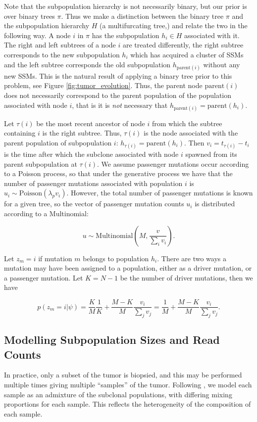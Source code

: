 \documentclass{bioinfo}
\newcommand{\parent}{\text{parent}}
\newcommand{\Poisson}{\mathrm{Poisson} }
\newcommand{\Multinomial}{\mathrm{Multinomial}}
\begin{document}
\begin{methods}
Note that the subpopulation hierarchy is not necessarily binary, but our prior is over binary trees $\pi$.  Thus we make a distinction between the binary tree $\pi$ and the subpopulation hierarchy $H$ (a multifurcating tree,) and relate the two in the following way.  A node $i$ in $\pi$ has the subpopulation $h_i \in H$ associated with it.  The right and left subtrees of a node $i$ are treated differently, the right subtree corresponds to the new subpopulation $h_{i}$ which has acquired a cluster of SSMs and the left subtree corresponds the old subpopulation $h_{\parent(i)}$ without any new SSMs.  This is the natural result of applying a binary tree prior to this problem, see Figure \ref{fig:tumor_evolution}.  Thus, the parent node $\parent(i)$ does not necessarily correspond to the parent population of the population associated with node $i$, that is it is \emph{not} necessary that $h_{\parent(i)} = \parent(h_i)$. 

Let $\tau(i)$ be the most recent ancestor of node $i$ from which the subtree containing $i$ is the right subtree.  Thus, $\tau(i)$ is the node associated with the parent population of subpopulation $i$: $h_{\tau(i)} = \parent(h_i)$.  Then $v_i = t_{\tau(i)} - t_i$ is the time after which the subclone associated with node $i$ spawned from its parent subpopulation at $\tau(i)$.  We assume passenger mutations occur according to a Poisson process, so that under the generative process we have that the number of passenger mutations associated with population $i$ is $u_i \sim \Poisson(\lambda_p v_i)$. However, the total number of passenger mutations is known for a given tree, so the vector of passenger mutation counts $u_i$ is distributed according to a Multinomial:

\begin{equation} u \sim \Multinomial\left(M, \frac{v}{\sum_i v_i}\right). \end{equation}

Let $z_m=i$ if mutation $m$ belongs to population $h_i$.  There are two ways a mutation may have been assigned to a population, either as a driver mutation, or a passenger mutation.  Let $K=N-1$ be the number of driver mutations, then we have

\begin{equation}
p(z_m=i|\psi) = \frac{K}{M}\frac{1}{K} + \frac{M-K}{M} \frac{v_i}{\sum_j v_j} = \frac{1}{M} + \frac{M-K}{M} \frac{v_i}{\sum_j v_j}.
\end{equation}
 
\subsection{Modelling Subpopulation Sizes and Read Counts}
In practice, only a subset of the tumor is biopsied, and this may be performed multiple times giving multiple ``samples'' of the tumor.  Following \cite{Pritchard2000}, we model each sample as an admixture of the subclonal populations, with differing mixing proportions for each sample.  This reflects the heterogeneity of the composition of each sample.


\end{methods}
\end{document}
